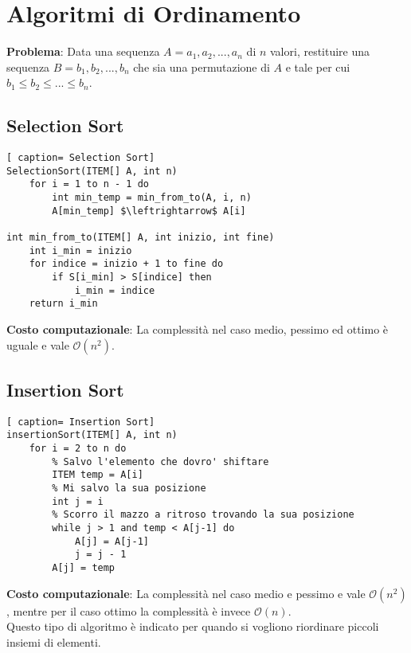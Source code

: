 \documentclass[../cheatSheetAlgoritmi.tex]{subfiles}
\begin{document}
\section{Algoritmi di Ordinamento}
\textbf{Problema}: Data una sequenza $A = a_1, a_2 , ..., a_n$ di $n$ valori, restituire una sequenza $B = b_1 , b_2 , ..., b_n$ che sia una permutazione di $A$ e tale per cui $b_1 \leq b_2 \leq ... \leq b_n$.
\subsection{Selection Sort}
\begin{lstlisting}[ caption= Selection Sort]
SelectionSort(ITEM[] A, int n)
	for i = 1 to n - 1 do
		int min_temp = min_from_to(A, i, n)
		A[min_temp] $\leftrightarrow$ A[i]

int min_from_to(ITEM[] A, int inizio, int fine)
	int i_min = inizio
  	for indice = inizio + 1 to fine do
		if S[i_min] > S[indice] then
			i_min = indice
	return i_min
\end{lstlisting}
\textbf{Costo computazionale}: La complessità nel caso medio, pessimo ed ottimo è uguale e vale $\mathcal{O}(n^{2})$.
\subsection{Insertion Sort}
\begin{lstlisting}[ caption= Insertion Sort]
insertionSort(ITEM[] A, int n)
	for i = 2 to n do
		% Salvo l'elemento che dovro' shiftare
		ITEM temp = A[i]
		% Mi salvo la sua posizione
		int j = i
		% Scorro il mazzo a ritroso trovando la sua posizione
		while j > 1 and temp < A[j-1] do
			A[j] = A[j-1]
			j = j - 1
		A[j] = temp
\end{lstlisting}
\textbf{Costo computazionale}: La complessità nel caso medio e pessimo  e vale $\mathcal{O}(n^{2})$, mentre per il caso ottimo la complessità è invece $\mathcal{O}(n)$. \\
Questo tipo di algoritmo è indicato per quando si vogliono riordinare piccoli insiemi di elementi.
\newpage
\end{document}
